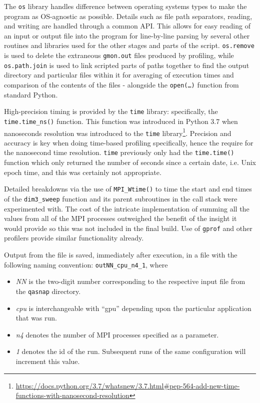 \documentclass[conference]{IEEEtran}
\begin{document}
The \texttt{os} library handles difference between operating systems types to make the program as OS-agnostic as possible. Details such as file path separators, reading, and writing are handled through a common API. This allows for easy reading of an input or output file into the program for line-by-line parsing by several other routines and libraries used for the other stages and parts of the script. \texttt{os.remove} is used to delete the extraneous \texttt{gmon.out} files produced by profiling, while \texttt{os.path.join} is used to link scripted parts of paths together to find the output directory and particular files within it for averaging of execution times and comparison of the contents of the files - alongside the \texttt{open(\dots)} function from standard Python.

High-precision timing is provided by the \texttt{time} library: specifically, the \texttt{time.time\_ns()} function. This function was introduced in Python 3.7 when nanoseconds resolution was introduced to the \texttt{time} library\footnote{\url{https://docs.python.org/3.7/whatsnew/3.7.html#pep-564-add-new-time-functions-with-nanosecond-resolution}}. Precision and accuracy is key when doing time-based profiling specifically, hence the require for the nanosecond time resolution. \texttt{time} previously only had the \texttt{time.time()} function which only returned the number of seconds since a certain date, i.e. Unix epoch time, and this was certainly not appropriate. 

Detailed breakdowns via the use of \texttt{MPI\_Wtime()} to time the start and end times of the \texttt{dim3\_sweep} function and its parent subroutines in the call stack were experimented with. The cost of the intricate implementation of summing all the values from all of the MPI processes outweighed the benefit of the insight it would provide so this was not included in the final build. Use of \texttt{gprof} and other profilers provide similar functionality already.

Output from the file is saved, immediately after execution, in a file with the following naming convention: \texttt{outNN\_cpu\_n4\_1}, where

\begin{itemize}
    \item \textit{NN} is the two-digit number corresponding to the respective input file from the \texttt{qasnap} directory.
    \item \textit{cpu} is interchangeable with ``gpu'' depending upon the particular application that was run.
    \item \textit{n4} denotes the number of MPI processes specified as a parameter.
    \item \textit{1} denotes the id of the run. Subsequent runs of the same configuration will increment this value.
\end{itemize}
\end{document}
